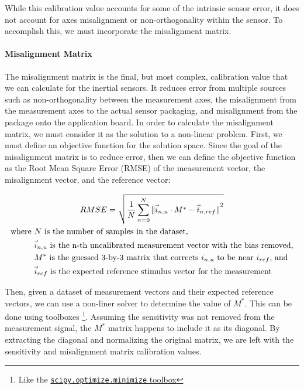 While this calibration value accounts for some of the intrinsic sensor error, it does not account for axes misalignment or non-orthogonality within the sensor. To accomplish this, we must incorporate the misalignment matrix.

\paragraph*{Misalignment Matrix}

The misalignment matrix is the final, but most complex, calibration value that we can calculate for the inertial sensors. It reduces error from multiple sources such as non-orthogonality between the measurement axes, the misalignment from the measurement axes to the actual sensor packaging, and misalignment from the package onto the application board. In order to calculate the misalignment matrix, we must consider it as the solution to a non-linear problem. First, we must define an objective function for the solution space. Since the goal of the misalignment matrix is to reduce error, then we can define the objective function as the Root Mean Square Error (RMSE) of the measurement vector, the misalignment vector, and the reference vector:

\begin{gather} \label{eq:misalignment_obj_func}
    RMSE = \sqrt{\frac{1}{N}\sum_{n=0}^N{\|{\vec{i}_{n,u} \cdot M^* -\vec{i}_{n,ref}\|}^2}} \\
    \begin{aligned}
        \text{where } & N \text{ is the number of samples in the dataset,} \\
        & \vec{i}_{n,u} \text{ is the n-th uncalibrated measurement vector with the bias removed,} \\
        & M^* \text{ is the guessed 3-by-3 matrix that corrects $i_{n,u}$ to be near $i_{ref}$, and } \\
        & \vec{i}_{ref} \text{ is the expected reference stimulus vector for the measurement}
    \end{aligned} \notag
\end{gather}

Then, given a dataset of measurement vectors and their expected reference vectors, we can use a non-liner solver to determine the value of $M^*$. This can be done using toolboxes \footnote[4]{Like the \href{https://docs.scipy.org/doc/scipy/reference/generated/scipy.optimize.minimize.html}{\lstinline{scipy.optimize.minimize} toolbox}}. 
Assuming the sensitivity was not removed from the measurement signal, the $M^*$ matrix happens to include it as its diagonal. 
By extracting the diagonal and normalizing the original matrix, we are left with the sensitivity and misalignment matrix calibration values.

